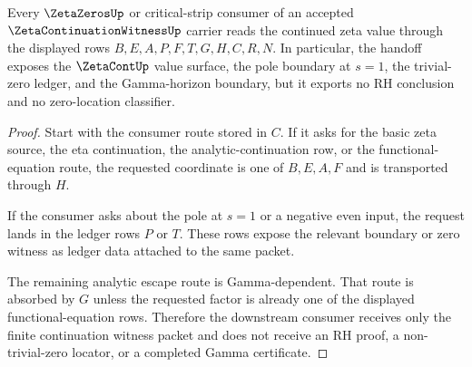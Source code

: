 \begin{theorem}
\label{thm:zeta-continuation-witness-continuation-handoff}
Every $\ZetaZerosUp$ or critical-strip consumer of an accepted $\ZetaContinuationWitnessUp$ carrier reads the continued zeta value through the displayed rows $B,E,A,P,F,T,G,H,C,R,N$. In particular, the handoff exposes the $\ZetaContUp$ value surface, the pole boundary at $s=1$, the trivial-zero ledger, and the Gamma-horizon boundary, but it exports no RH conclusion and no zero-location classifier.
\end{theorem}
\begin{proof}
Start with the consumer route stored in $C$. If it asks for the basic zeta source, the eta continuation, the analytic-continuation row, or the functional-equation route, the requested coordinate is one of $B,E,A,F$ and is transported through $H$.

If the consumer asks about the pole at $s=1$ or a negative even input, the request lands in the ledger rows $P$ or $T$. These rows expose the relevant boundary or zero witness as ledger data attached to the same packet.

The remaining analytic escape route is Gamma-dependent. That route is absorbed by $G$ unless the requested factor is already one of the displayed functional-equation rows. Therefore the downstream consumer receives only the finite continuation witness packet and does not receive an RH proof, a non-trivial-zero locator, or a completed Gamma certificate.
\end{proof}

